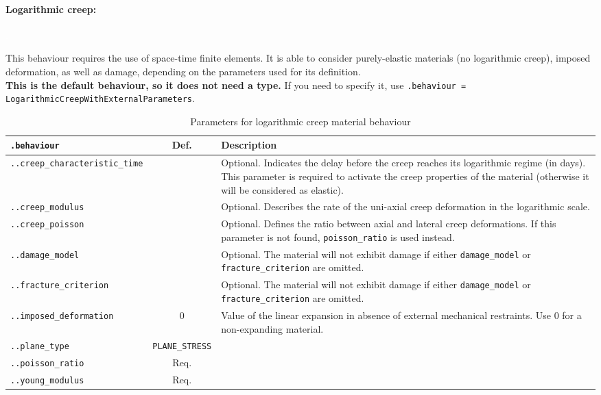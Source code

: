 \documentclass[10pt]{article}
\newcommand{\whiteline}{\textcolor{white}{.\\}}
\begin{document}
\paragraph{Logarithmic creep:} \whiteline

This behaviour requires the use of space-time finite elements. It is able to consider purely-elastic materials (no logarithmic creep), imposed deformation, as well as damage, depending on the parameters used for its definition.\\

\textbf{This is the default behaviour, so it does not need a type.} If you need to specify it, use \verb+.behaviour = LogarithmicCreepWithExternalParameters+.

\begin{table}[h!]
\begin{tabularx}{\textwidth}{lcX}
\verb+.behaviour+ & Def. & Description\\
\hline
\verb+..creep_characteristic_time+ & & Optional. Indicates the delay before the creep reaches its logarithmic regime (in days). This parameter is required to activate the creep properties of the material (otherwise it will be considered as elastic).\\
\verb+..creep_modulus+ & & Optional. Describes the rate of the uni-axial creep deformation in the logarithmic scale.\\
\verb+..creep_poisson+ & & Optional. Defines the ratio between axial and lateral creep deformations. If this parameter is not found, \verb+poisson_ratio+ is used instead. \\
\verb+..damage_model+ &   & Optional. The material will not exhibit damage if either \verb+damage_model+ or \verb+fracture_criterion+ are omitted.\\	
\verb+..fracture_criterion+ &   & Optional. The material will not exhibit damage if either \verb+damage_model+ or \verb+fracture_criterion+ are omitted.\\	
\verb+..imposed_deformation+ & 0 & Value of the linear expansion in absence of external mechanical restraints. Use 0 for a non-expanding material.\\
\verb+..plane_type+ & \verb+PLANE_STRESS+ & \\
\verb+..poisson_ratio+ & Req. & \\
\verb+..young_modulus+ & Req. & \\
\hline
\end{tabularx}
\caption{Parameters for logarithmic creep material behaviour}
\end{table}
\end{document}
